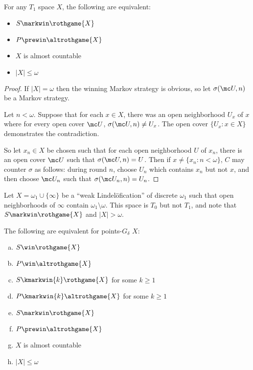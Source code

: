   \begin{thm}
    For any $T_1$ space $X$, the following are equivalent:
    \begin{itemize}
      \item $S\markwin\rothgame{X}$
      \item $P\prewin\altrothgame{X}$
      \item $X$ is almost countable
      \item $|X|\leq\omega$
    \end{itemize}
  \end{thm}

  \begin{proof}
    If $|X|=\omega$ then the winning Markov strategy is obvious, so let $\sigma(\mc U,n)$ be a Markov strategy.

    Let $n<\omega$. Suppose that for each $x\in X$, there was an open neighborhood $U_x$ of $x$ where for every open cover $\mc U$, $\sigma(\mc U,n) \not= U_x$. The open cover $\{U_x : x\in X\}$ demonstrates the contradiction.

    So let $x_n\in X$ be chosen such that for each open neighborhood $U$ of $x_n$, there is an open cover $\mc U$ such that $\sigma(\mc U,n)=U$. Then if $x\not=\{x_n : n<\omega\}$, $C$ may counter $\sigma$ as follows: during round $n$, choose $U_n$ which contains $x_n$ but not $x$, and then choose $\mc U_n$ such that $\sigma(\mc U_n,n)=U_n$.
  \end{proof}

  \begin{ex}
    Let $X=\omega_1\cup\{\infty\}$ be a ``weak Lindel\"ofication'' of discrete $\omega_1$ such that open neighborhoods of $\infty$ contain $\omega_1\setminus\omega$. This space is $T_0$ but not $T_1$, and note that $S\markwin\rothgame{X}$ and $|X|>\omega$.
  \end{ex}

  \begin{thm}
    The following are equivalent for points-$G_\delta$ $X$:
      \begin{enumerate}[(a)]
        \item $S\win\rothgame{X}$
        \item $P\win\altrothgame{X}$
        \item $S\kmarkwin{k}\rothgame{X}$ for some $k\geq 1$
        \item $P\kmarkwin{k}\altrothgame{X}$ for some $k\geq 1$
        \item $S\markwin\rothgame{X}$
        \item $P\prewin\altrothgame{X}$
        \item $X$ is almost countable
        \item $|X|\leq\omega$
      \end{enumerate}
  \end{thm}

